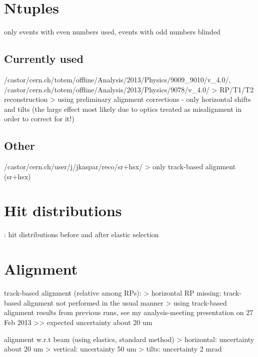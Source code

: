 \section{Ntuples}

\> only events with even numbers used, events with odd numbers blinded

\subsection{Currently used}

\> /castor/cern.ch/totem/offline/Analysis/2013/Physics/9009\_9010/v\_4.0/,\\ /castor/cern.ch/totem/offline/Analysis/2013/Physics/9078/v\_4.0/
\>> RP/T1/T2 reconstruction
\>> using preliminary alignment corrections - only horizontal shifts and tilts (the large effect most likely due to optics treated as misalignment in order to correct for it!)

\subsection{Other}

\> /castor/cern.ch/user/j/jkaspar/reco/sr+hsx/
\>> only track-based alignment (sr+hsx)

\section{Hit distributions}

\>  : hit distributions before and after elastic selection

\section{Alignment}

\> track-based alignment (relative among RPs):
\>> horizontal RP missing: track-based alignment not performed in the usual manner
\>> using track-based alignment results from previous runs, see my analysis-meeting presentation on 27 Feb 2013
\>>> expected uncertainty about 20 um

\> alignment w.r.t beam (using elastics, standard method)
\>> horizontal: uncertainty about 20 um
\>> vertical: uncertainty 50 um
\>> tilts: uncertainty 2 mrad

